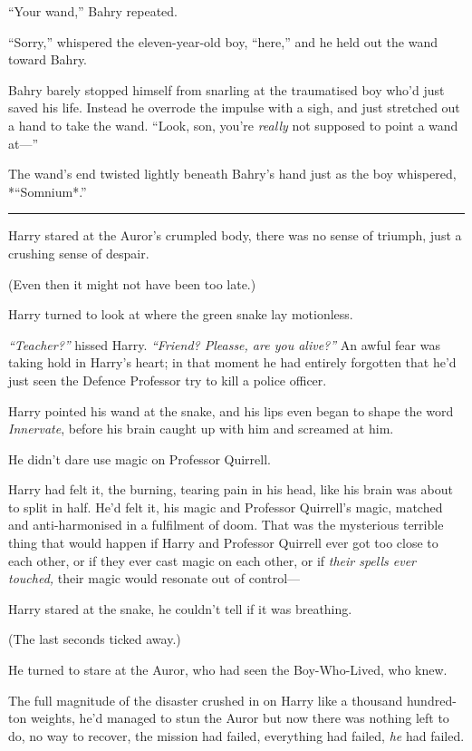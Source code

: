 ``Your wand,'' Bahry repeated.

``Sorry,'' whispered the eleven-year-old boy, ``here,'' and he held out
the wand toward Bahry.

Bahry barely stopped himself from snarling at the traumatised boy who'd
just saved his life. Instead he overrode the impulse with a sigh, and
just stretched out a hand to take the wand. ``Look, son, you're
\emph{really} not supposed to point a wand at---''

The wand's end twisted lightly beneath Bahry's hand just as the boy
whispered, *``Somnium*.''

\begin{center}\rule{3in}{0.4pt}\end{center}

Harry stared at the Auror's crumpled body, there was no sense of
triumph, just a crushing sense of despair.

(Even then it might not have been too late.)

Harry turned to look at where the green snake lay motionless.

\emph{``Teacher?''} hissed Harry. \emph{``Friend? Pleasse, are you
alive?''} An awful fear was taking hold in Harry's heart; in that moment
he had entirely forgotten that he'd just seen the Defence Professor try
to kill a police officer.

Harry pointed his wand at the snake, and his lips even began to shape
the word \emph{Innervate}, before his brain caught up with him and
screamed at him.

He didn't dare use magic on Professor Quirrell.

Harry had felt it, the burning, tearing pain in his head, like his brain
was about to split in half. He'd felt it, his magic and Professor
Quirrell's magic, matched and anti-harmonised in a fulfilment of doom.
That was the mysterious terrible thing that would happen if Harry and
Professor Quirrell ever got too close to each other, or if they ever
cast magic on each other, or if \emph{their spells ever touched,} their
magic would resonate out of control---

Harry stared at the snake, he couldn't tell if it was breathing.

(The last seconds ticked away.)

He turned to stare at the Auror, who had seen the Boy-Who-Lived, who
knew.

The full magnitude of the disaster crushed in on Harry like a thousand
hundred-ton weights, he'd managed to stun the Auror but now there was
nothing left to do, no way to recover, the mission had failed,
everything had failed, \emph{he} had failed.

